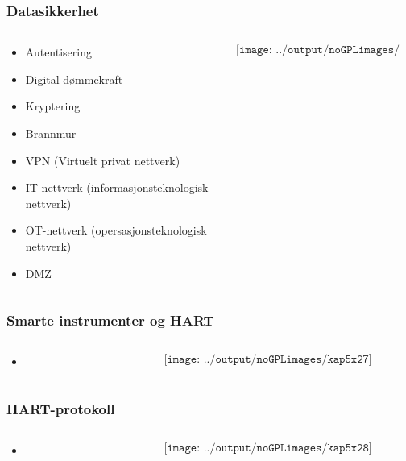 \documentclass[aspectratio=169,xcolor=dvipsnames]{beamer}
\begin{document}
\begin{frame}
	\frametitle{Datasikkerhet}
	\begin{columns}
		\begin{column}{0.5\textwidth}

			\begin{itemize}
				\item Autentisering
				\item Digital dømmekraft
				\item Kryptering
				\item Brannmur
				\item VPN (Virtuelt privat nettverk)
				\item IT-nettverk (informasjonsteknologisk nettverk)
				\item OT-nettverk (opersasjonsteknologisk nettverk)
				\item DMZ
			\end{itemize}

			
		\end{column}

		\begin{column}{0.5\textwidth}
	$$\texttt{[image: ../output/noGPLimages/kap5x26]}$$
		\end{column}
	\end{columns}
\end{frame}
\begin{frame}
	\frametitle{Smarte instrumenter og HART}
	\begin{columns}
		\begin{column}{0.5\textwidth}

			\begin{itemize}
				\item      
			\end{itemize}

			
		\end{column}

		\begin{column}{0.5\textwidth}
	$$\texttt{[image: ../output/noGPLimages/kap5x27]}$$
		\end{column}
	\end{columns}
\end{frame}
\begin{frame}
	\frametitle{HART-protokoll}
	\begin{columns}
		\begin{column}{0.5\textwidth}

			\begin{itemize}
				\item      
			\end{itemize}

			
		\end{column}

		\begin{column}{0.5\textwidth}
	$$\texttt{[image: ../output/noGPLimages/kap5x28]}$$
		\end{column}
	\end{columns}
\end{frame}
\end{document}
